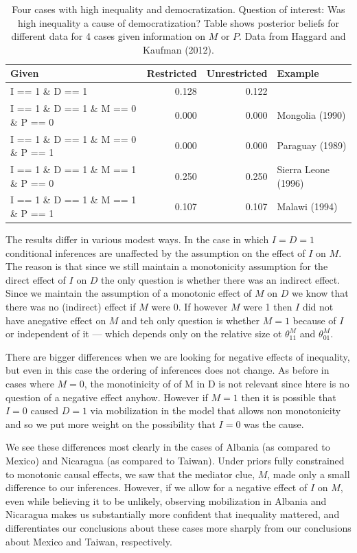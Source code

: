 \documentclass[
  12pt,
]{book}
\begin{document}
\begin{table}

\caption{\label{tab:HK8cases2quant}\label{tab:HK8cases2} Four cases with high inequality and  democratization. Question of interest: Was high inequality a cause of democratization? Table shows posterior beliefs for different data for 4 cases given information on $M$ or $P$. Data from Haggard and Kaufman (2012).}
\centering
\begin{tabular}[t]{l|r|r|l}
\hline
Given & Restricted & Unrestricted & Example\\
\hline
I == 1  \& D ==  1 & 0.128 & 0.122 & \\
\hline
I == 1  \& D ==  1 \& M == 0 \& P == 0 & 0.000 & 0.000 & Mongolia (1990)\\
\hline
I == 1  \& D ==  1 \& M == 0 \& P == 1 & 0.000 & 0.000 & Paraguay (1989)\\
\hline
I == 1  \& D ==  1 \& M == 1 \& P == 0 & 0.250 & 0.250 & Sierra Leone (1996)\\
\hline
I == 1  \& D ==  1 \& M == 1 \& P == 1 & 0.107 & 0.107 & Malawi (1994)\\
\hline
\end{tabular}
\end{table}

The results differ in various modest ways. In the case in which \(I=D=1\) conditional inferences are unaffected by the assumption on the effect of \(I\) on \(M\). The reason is that since we still maintain a monotonicity assumption for the direct effect of \(I\) on \(D\) the only question is whether there was an indirect effect. Since we maintain the assumption of a monotonic effect of \(M\) on \(D\) we know that there was no (indirect) effect if \(M\) were 0. If however \(M\) were 1 then \(I\) did not have anegative effect on \(M\) and teh only question is whether \(M=1\) because of \(I\) or independent of it --- which depends only on the relative size ot \(\theta^M_{11}\) and \(\theta^M_{01}\).

There are bigger differences when we are looking for negative effects of inequality, but even in this case the ordering of inferences does not change. As before in cases where \(M=0\), the monotinicity of of M in D is not relevant since htere is no question of a negative effect anyhow. However if \(M=1\) then it is possible that \(I=0\) caused \(D=1\) via mobilization in the model that allows non monotonicity and so we put more weight on the possibility that \(I=0\) was the cause.

We see these differences most clearly in the cases of Albania (as compared to Mexico) and Nicaragua (as compared to Taiwan). Under priors fully constrained to monotonic causal effects, we saw that the mediator clue, \(M\), made only a small difference to our inferences. However, if we allow for a negative effect of \(I\) on \(M\), even while believing it to be unlikely, observing mobilization in Albania and Nicaragua makes us substantially more confident that inequality mattered, and differentiates our conclusions about these cases more sharply from our conclusions about Mexico and Taiwan, respectively.
\end{document}
